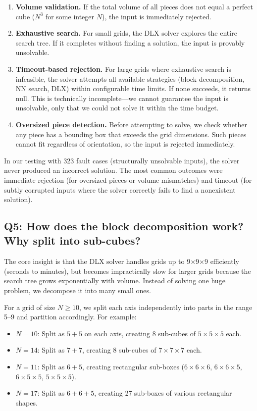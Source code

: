 \documentclass[11pt]{article}
\begin{document}
\begin{enumerate}[nosep]
  \item \textbf{Volume validation.} If the total volume of all pieces does not equal a perfect cube ($N^3$ for some integer $N$), the input is immediately rejected.
  \item \textbf{Exhaustive search.} For small grids, the DLX solver explores the entire search tree. If it completes without finding a solution, the input is provably unsolvable.
  \item \textbf{Timeout-based rejection.} For large grids where exhaustive search is infeasible, the solver attempts all available strategies (block decomposition, NN search, DLX) within configurable time limits. If none succeeds, it returns null. This is technically incomplete---we cannot guarantee the input is unsolvable, only that we could not solve it within the time budget.
  \item \textbf{Oversized piece detection.} Before attempting to solve, we check whether any piece has a bounding box that exceeds the grid dimensions. Such pieces cannot fit regardless of orientation, so the input is rejected immediately.
\end{enumerate}

In our testing with 323 fault cases (structurally unsolvable inputs), the solver never produced an incorrect solution. The most common outcomes were immediate rejection (for oversized pieces or volume mismatches) and timeout (for subtly corrupted inputs where the solver correctly fails to find a nonexistent solution).

\subsection*{Q5: How does the block decomposition work? Why split into sub-cubes?}

The core insight is that the DLX solver handles grids up to 9$\times$9$\times$9 efficiently (seconds to minutes), but becomes impractically slow for larger grids because the search tree grows exponentially with volume. Instead of solving one huge problem, we decompose it into many small ones.

For a grid of size $N \geq 10$, we split each axis independently into parts in the range 5--9 and partition accordingly. For example:

\begin{itemize}[nosep]
  \item $N=10$: Split as $5+5$ on each axis, creating 8 sub-cubes of $5\times5\times5$ each.
  \item $N=14$: Split as $7+7$, creating 8 sub-cubes of $7\times7\times7$ each.
  \item $N=11$: Split as $6+5$, creating rectangular sub-boxes ($6\times6\times6$, $6\times6\times5$, $6\times5\times5$, $5\times5\times5$).
  \item $N=17$: Split as $6+6+5$, creating 27 sub-boxes of various rectangular shapes.
\end{itemize}
\end{document}
